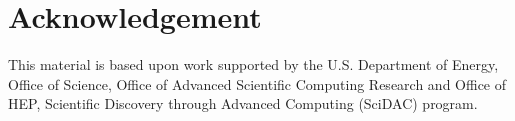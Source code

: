 \documentclass{webofc}
\begin{document}
%
 
\section*{Acknowledgement}
 This material is based upon work supported by the U.S. Department of Energy,
 Office of Science, Office of Advanced Scientific Computing Research and Office
 of HEP, Scientific Discovery through Advanced Computing (SciDAC) program.
\end{document}
